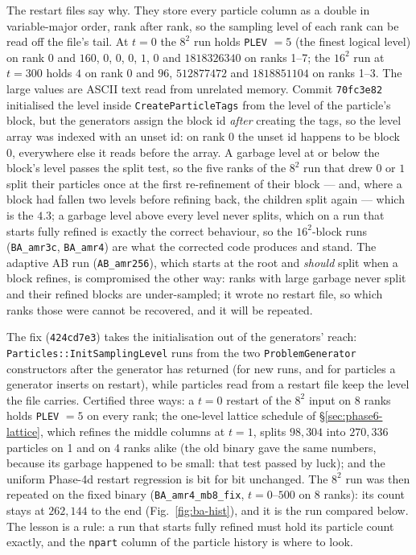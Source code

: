 \documentclass[11pt]{article}
\newcommand{\code}[1]{\texttt{#1}}
\begin{document}
The restart files say why. They store every particle column as a double in
variable-major order, rank after rank, so the sampling level of each rank can be read
off the file's tail. At $t = 0$ the $8^2$ run holds \code{PLEV} $= 5$ (the finest logical
level) on rank 0 and $160$, $0$, $0$, $0$, $1$, $0$ and $1818326340$ on ranks 1--7; the
$16^2$ run at $t = 300$ holds $4$ on rank 0 and $96$, $512877472$ and $1818851104$ on
ranks 1--3. The large values are ASCII text read from unrelated memory. Commit
\code{70fc3e82} initialised the level inside \code{CreateParticleTags} from the level of
the particle's block, but the generators assign the block id \emph{after} creating the
tags, so the level array was indexed with an unset id: on rank 0 the unset id happens to
be block 0, everywhere else it reads before the array. A garbage level at or below the
block's level passes the split test, so the five ranks of the $8^2$ run that drew $0$ or
$1$ split their particles once at the first re-refinement of their block --- and, where a
block had fallen two levels before refining back, the children split again --- which is
the $4.3$; a garbage level above every level never splits, which on a run that starts
fully refined is exactly the correct behaviour, so the $16^2$-block runs
(\code{BA\_amr3c}, \code{BA\_amr4}) are what the corrected code produces and stand. The
adaptive AB run (\code{AB\_amr256}), which starts at the root and \emph{should} split
when a block refines, is compromised the other way: ranks with large garbage never
split and their refined blocks are under-sampled; it wrote no restart file, so which
ranks those were cannot be recovered, and it will be repeated.

The fix (\code{424cd7e3}) takes the initialisation out of the generators' reach:
\code{Particles::InitSamplingLevel} runs from the two \code{ProblemGenerator} constructors
after the generator has returned (for new runs, and for particles a generator inserts on
restart), while particles read from a restart file keep the level the file carries.
Certified three ways: a $t = 0$ restart of the $8^2$ input on 8 ranks holds \code{PLEV}
$= 5$ on every rank; the one-level lattice schedule of \S\ref{sec:phase6-lattice}, which
refines the middle columns at $t = 1$, splits $98{,}304$ into $270{,}336$ particles on 1
and on 4 ranks alike (the old binary gave the same numbers, because its garbage happened
to be small: that test passed by luck); and the uniform Phase-4d restart regression is
bit for bit unchanged. The $8^2$ run was then repeated on the fixed binary
(\code{BA\_amr4\_mb8\_fix}, $t = 0$--$500$ on 8 ranks): its count stays at $262{,}144$ to
the end (Fig.~\ref{fig:ba-hist}), and it is the run compared below. The lesson is a rule: a run that starts fully refined must hold its particle count exactly,
and the \code{npart} column of the particle history is where to look.
\end{document}
